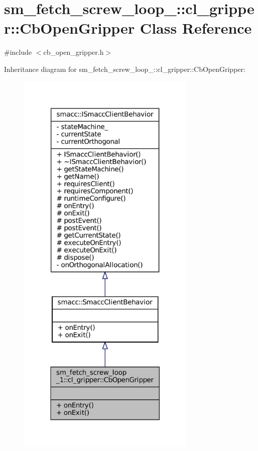 \hypertarget{classsm__fetch__screw__loop__1_1_1cl__gripper_1_1CbOpenGripper}{}\section{sm\+\_\+fetch\+\_\+screw\+\_\+loop\+\_\+:\+:cl\+\_\+gripper\+:\+:Cb\+Open\+Gripper Class Reference}
\label{classsm__fetch__screw__loop__1_1_1cl__gripper_1_1CbOpenGripper}


{\ttfamily \#include $<$cb\+\_\+open\+\_\+gripper.\+h$>$}



Inheritance diagram for sm\+\_\+fetch\+\_\+screw\+\_\+loop\+\_\+:\+:cl\+\_\+gripper\+:\+:Cb\+Open\+Gripper\+:
\nopagebreak
\begin{figure}[H]
\begin{center}
\leavevmode
\includegraphics[width=242pt]{classsm__fetch__screw__loop__1_1_1cl__gripper_1_1CbOpenGripper__inherit__graph}
\end{center}
\end{figure}


